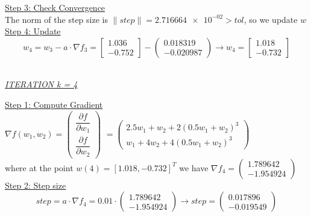 \underline{Step 3: Check Convergence}\\
The norm of the step size is $\| step \| = \num{2.716664e-02} > tol$, so we update $w$
\\[4mm]

\underline{Step 4: Update}
\[ 
w_4 = w_3 - a\cdot \nabla f_3 =  \left[\begin{array}{c}
	1.036\\
	-0.752
\end{array}\right] - \left(\begin{array}{c}
	0.018319 \\
	-0.020987
\end{array}\right) \rightarrow
w_4 = \left[\begin{array}{c}
	1.018\\
	-0.732
\end{array}\right]
\]
\\[4mm]

\begin{center}
	\underline{\textit{ITERATION k = 4}}
\end{center}

\underline{Step 1: Compute Gradient}\\
\(\nabla f(w_1,w_2) = \left(\begin{array}{c}
	\dfrac{\partial f}{\partial w_1} \\[4mm]
	\dfrac{\partial f}{\partial w_2}
\end{array}\right)\) $= \left(\begin{array}{c}
	2.5w_1 + w_2 + 2(0.5w_1+w_2)^3\\[1mm]
	w_1 + 4w_2 + 4(0.5w_1+w_2)^3
\end{array}\right)$ \\[3mm]

where at the point $w\left(4\right) = \left[1.018, -0.732\right]^T$ we have $\nabla f_{4} = \left(\begin{array}{c}
	1.789642 \\
	-1.954924
\end{array}\right)$
\\[4mm]

\underline{Step 2: Step size}
\[
step = a \cdot \nabla f_{4} = 0.01 \cdot \left(\begin{array}{c}
	1.789642 \\
-1.954924
\end{array}\right) \rightarrow step =\left(\begin{array}{c}
	0.017896 \\
	-0.019549
\end{array}\right)
\]
\\[4mm]

